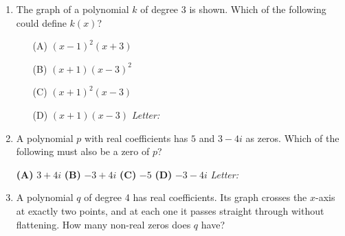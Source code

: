 \documentclass[10pt]{article}
\begin{document}
\begin{enumerate}[leftmargin=1.9em, itemsep=10pt]
\item \begin{minipage}[t]{0.56\linewidth}
      The graph of a polynomial $k$ of degree 3 is shown. Which of the following could define
      $k(x)$?
      \begin{enumerate}[leftmargin=2.6em, itemsep=3pt]
        \item[(A)] $(x - 1)^2(x + 3)$
        \item[(B)] $(x + 1)(x - 3)^2$
        \item[(C)] $(x + 1)^2(x - 3)$
        \item[(D)] $(x + 1)(x - 3)$ \hfill\textit{Letter:}~\gradedblank[id=ap3, type=choice, points=1, answer=C]{0.42in}{13pt}
      \end{enumerate}
      \end{minipage}\hfill
      \begin{minipage}[t]{0.38\linewidth}
      \vspace{-4pt}
      \centering
      \end{minipage}

\item A polynomial $p$ with real coefficients has $5$ and $3 - 4i$ as zeros. Which of the
      following must also be a zero of $p$?

      \smallskip
      \textbf{(A)} $3 + 4i$ \hspace{2.2em} \textbf{(B)} $-3 + 4i$ \hspace{2.2em} \textbf{(C)} $-5$ \hspace{2.2em} \textbf{(D)} $-3 - 4i$
      \hfill\textit{Letter:}~\gradedblank[id=ap4, type=choice, points=1, answer=A]{0.42in}{13pt}

\item A polynomial $q$ of degree 4 has real coefficients. Its graph crosses the $x$-axis at exactly
      two points, and at each one it passes straight through without flattening. How many
      non-real zeros does $q$ have?


\end{enumerate}
\end{document}
